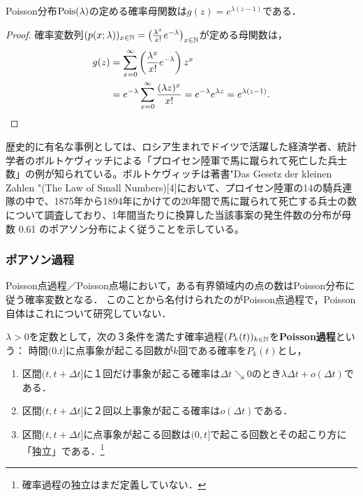 \documentclass[uplatex,dvipdfmx]{jsreport}
\begin{document}
\begin{proposition}[Poisson分布の確率母関数]
    Poisson分布$\mathrm{Pois}(\lambda)$の定める確率母関数は$g(z)=e^{\lambda(z-1)}$である．
\end{proposition}
\begin{proof}
    確率変数列$(p(x;\lambda))_{x\in\mathbb{N}}=\left(\frac{\lambda^x}{x!}e^{-\lambda}\right)_{x\in\mathbb{N}}$が定める母関数は，
    \begin{align*}
        g(z)&=\sum_{x=0}^\infty \left(\frac{\lambda^x}{x!}e^{-\lambda}\right)z^x\\
        &=e^{-\lambda}\sum_{x=0}^\infty\frac{(\lambda z)^x}{x!}=e^{-\lambda}e^{\lambda z}=e^{\lambda(z-1)}.
    \end{align*}
\end{proof}

\begin{history}
    歴史的に有名な事例としては、ロシア生まれでドイツで活躍した経済学者、統計学者のボルトケヴィッチによる「プロイセン陸軍で馬に蹴られて死亡した兵士数」の例が知られている。ボルトケヴィッチは著書"Das Gesetz der kleinen Zahlen "(The Law of Small Numbers)[4]において、プロイセン陸軍の14の騎兵連隊の中で、1875年から1894年にかけての20年間で馬に蹴られて死亡する兵士の数について調査しており、1年間当たりに換算した当該事案の発生件数の分布が母数 0.61 のポアソン分布によく従うことを示している。 
\end{history}

\subsubsection{ポアソン過程}

\begin{tcolorbox}[colframe=ForestGreen, colback=ForestGreen!10!white,breakable,colbacktitle=ForestGreen!40!white,coltitle=black,fonttitle=\bfseries\sffamily,
title=]
    Poisson点過程／Poisson点場において，ある有界領域内の点の数はPoisson分布に従う確率変数となる．
    このことから名付けられたのがPoisson点過程で，Poisson自体はこれについて研究していない．
\end{tcolorbox}

\begin{definition}
    $\lambda>0$を定数として，次の３条件を満たす確率過程$(P_k(t))_{k\in\mathbb{N}}$を\textbf{Poisson過程}という：
    時間$(0.t]$に点事象が起こる回数が$k$回である確率を$P_k(t)$とし，
    \begin{enumerate}
        \item 区間$(t,t+\Delta t]$に１回だけ事象が起こる確率は$\Delta t\searrow 0$のとき$\lambda\Delta t+o(\Delta t)$である．
        \item 区間$(t,t+\Delta t]$に２回以上事象が起こる確率は$o(\Delta t)$である．
        \item 区間$(t,t+\Delta t]$に点事象が起こる回数は$(0,t]$で起こる回数とその起こり方に「独立」である．\footnote{確率過程の独立はまだ定義していない．}
    \end{enumerate}
\end{definition}
\end{document}

